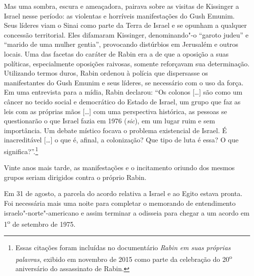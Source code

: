 Mas uma sombra, escura e ameaçadora, pairava sobre as visitas de
Kissinger a Israel nesse período: as violentas e horríveis manifestações
do Gush Emunim. Seus líderes viam o Sinai como parte da Terra de Israel
e se opunham a qualquer concessão territorial. Eles difamaram Kissinger,
denominando"-o ``garoto judeu'' e ``marido de uma mulher gentia'',
provocando distúrbios em Jerusalém e outros locais. Uma das facetas do
caráter de Rabin era a de que a oposição a suas políticas, especialmente
oposições raivosas, somente reforçavam sua determinação. Utilizando
termos duros, Rabin ordenou à polícia que dispersasse os manifestantes
do Gush Emunim e seus líderes, se necessário com o uso da força. Em uma
entrevista para a mídia, Rabin declarou: ``Os colonos {[}\ldots{}{]} são como um
câncer no tecido social e democrático do Estado de Israel, um grupo que
faz as leis com as próprias mãos {[}\ldots{}{]} com uma perspectiva histórica, as
pessoas se questionarão o que Israel fazia em 1976 (\textit{sic}), em um
lugar ruim e sem importância. Um debate místico focava o problema
existencial de Israel. É inacreditável {[}\ldots{}{]} o que é, afinal, a
colonização? Que tipo de luta é essa? O que significa?''.\footnote{Essas citações foram incluídas no documentário \textit{Rabin em suas próprias palavras},
exibido em novembro de 2015 como parte da celebração do
20\textsuperscript{o} aniversário do assassinato de Rabin.}

Vinte anos mais tarde, as manifestações e o incitamento oriundo dos
mesmos grupos seriam dirigidos contra o próprio Rabin.

Em 31 de agosto, a parcela do acordo relativa a Israel e ao Egito estava
pronta. Foi necessária mais uma noite para completar o memorando de
entendimento israelo"-norte"-americano e assim terminar a odisseia para
chegar a um acordo em 1\textsuperscript{o} de setembro de 1975.


